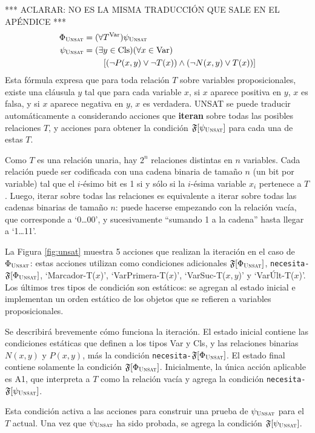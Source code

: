 *** ACLARAR: NO ES LA MISMA TRADUCCIÓN QUE SALE EN EL APÉNDICE ***
\begin{alignat*}{1}
\Phi_{\textsc{Unsat}} &= (\forall T^\text{Var})\psi_{\textsc{Unsat}} \\
\psi_{\textsc{Unsat}} &= (\exists y\in\text{Cls})(\forall x\in\text{Var}) \\
            &\quad\quad\ [(\neg P(x,y) \lor \neg T(x))\land(\neg N(x,y)\lor T(x))]
\end{alignat*}
Esta fórmula expresa que para toda relación $T$ sobre variables
proposicionales, existe una cláusula $y$ tal que para cada variable $x$, si $x$
aparece positiva en $y$, $x$ es falsa, y si $x$ aparece negativa en $y$, $x$ es
verdadera.
UNSAT se puede traducir automáticamente a \STRIPS considerando acciones que
\textbf{iteran} sobre todas las posibles relaciones $T$, y acciones para
obtener la condición $\mathfrak{F}[\psi_{\textsc{Unsat}}]$ para cada una de estas $T$.

Como $T$ es una relación unaria, hay $2^n$ relaciones distintas en $n$
variables. Cada relación puede ser codificada con una cadena binaria
de tamaño $n$ (un bit por variable) tal que el $i$-ésimo bit es 1 si y sólo si
la $i$-ésima variable $x_i$ pertenece a $T$. Luego, iterar sobre todas las
relaciones es equivalente a iterar sobre todas las cadenas binarias de tamaño
$n$: puede hacerse empezando con la relación vacía, que corresponde a
`0\ldots00', y sucesivamente ``sumando 1 a la cadena'' hasta llegar a `1\ldots11'.

La Figura \ref{fig:unsat} muestra 5 acciones que realizan la iteración en el
caso de $\Phi_{\textsc{Unsat}}$: estas
acciones utilizan como condiciones adicionales $\mathfrak{F}[\Phi_{\textsc{Unsat}}]$,
\texttt{necesita-}$\mathfrak{F}[\Phi_{\textsc{Unsat}}]$, `Marcador-T($x$)', `VarPrimera-T($x$)',
`VarSuc-T($x,y$)' y `VarÚlt-T($x$)'. Los últimos tres tipos de condición son
estáticos: se agregan al estado inicial e implementan un orden estático de los
objetos que se refieren a variables proposicionales.

Se describirá brevemente cómo funciona la iteración.
El estado inicial contiene las condiciones estáticas que definen a los tipos
Var y Cls, y las relaciones binarias 
$N(x,y)$ y $P(x,y)$, más la condición
\texttt{necesita-}$\mathfrak{F}[\Phi_{\textsc{Unsat}}]$. El estado final contiene solamente la
condición $\mathfrak{F}[\Phi_{\textsc{Unsat}}]$.
Inicialmente, la única acción aplicable es A1, que interpreta a $T$ como la
relación vacía y agrega la condición \texttt{necesita-}$\mathfrak{F}[\psi_{\textsc{Unsat}}]$.

Esta condición activa a las acciones para construir una prueba de $\psi_{\textsc{Unsat}}$
para el $T$ actual. Una vez que $\psi_{\textsc{Unsat}}$ ha sido probada, se agrega la
condición $\mathfrak{F}[\psi_{\textsc{Unsat}}]$.

